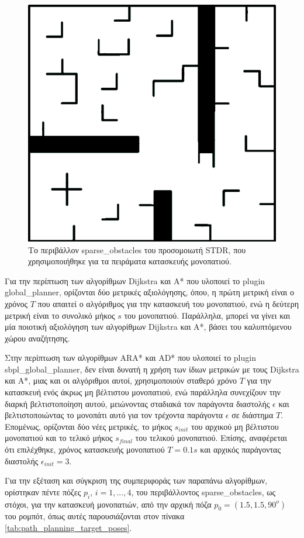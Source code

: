 \begin{figure}[!ht]
	\centering
	\includegraphics[width=0.6\linewidth]{Chapters/Chapter5/Figures/sparse_obstacles.png}
	\caption{Το περιβάλλον sparse{\_}obstacles του προσομοιωτή STDR, που χρησιμοποιήθηκε για τα πειράματα κατασκευής μονοπατιού.}
	\label{fig:sparse_obstacles}
\end{figure}

\bigskip
Για την περίπτωση των αλγορίθμων Dijkstra και A* που υλοποιεί το plugin global{\_}planner, ορίζονται δύο μετρικές αξιολόγησης, όπου, η πρώτη μετρική είναι ο χρόνος $T$ που απαιτεί ο αλγόριθμος για την κατασκευή του μονοπατιού, ενώ η δεύτερη μετρική είναι το συνολικό μήκος $s$ του μονοπατιού. Παράλληλα, μπορεί να γίνει και μία ποιοτική αξιολόγηση των αλγορίθμων Dijkstra και A*, βάσει του καλυπτόμενου χώρου αναζήτησης.

\bigskip
Στην περίπτωση των αλγορίθμων ARA* και AD* που υλοποιεί το plugin sbpl{\_}global{\_}planner, δεν είναι δυνατή η χρήση των ίδιων μετρικών με τους Dijkstra και A*, μιας και οι αλγόριθμοι αυτοί, χρησιμοποιούν σταθερό χρόνο $T$ για την κατασκευή ενός άκρως μη βέλτιστου μονοπατιού, ενώ παράλληλα συνεχίζουν την διαρκή βελτιστοποίηση αυτού, μειώνοντας σταδιακά τον παράγοντα διαστολής $\epsilon$ και βελτιστοποιώντας το μονοπάτι αυτό για τον τρέχοντα παράγοντα $\epsilon$ σε διάστημα $T$. Επομένως, ορίζονται δύο νέες μετρικές, το μήκος $s_{init}$ του αρχικού μη βέλτιστου μονοπατιού και το τελικό μήκος $s_{final}$ του τελικού μονοπατιού. Επίσης, αναφέρεται ότι επιλέχθηκε, χρόνος κατασκευής μονοπατιού $T=0.1s$ και αρχικός παράγοντας διαστολής $\epsilon_{init}=3$. 

\bigskip
Για την εξέταση και σύγκριση της συμπεριφοράς των παραπάνω αλγορίθμων, ορίστηκαν πέντε πόζες $p_i$, $i=1,...,4$, του περιβάλλοντος sparse{\_}obstacles, ως στόχοι, για την κατασκευή μονοπατιών, από την αρχική πόζα $p_0 = (1.5, 1.5, 90^o)$ του ρομπότ, όπως αυτές παρουσιάζονται στον πίνακα \ref{tab:path_planning_target_poses}.

